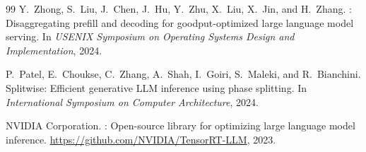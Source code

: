 \documentclass[10pt,twocolumn]{article}
\begin{document}
\begin{thebibliography}{99}
Y.~Zhong, S.~Liu, J.~Chen, J.~Hu, Y.~Zhu, X.~Liu, X.~Jin, and H.~Zhang.
: Disaggregating prefill and decoding for goodput-optimized
large language model serving.
\newblock In \textit{USENIX Symposium on Operating Systems Design and
Implementation}, 2024.

P.~Patel, E.~Choukse, C.~Zhang, A.~Shah, I.~Goiri, S.~Maleki, and
R.~Bianchini.
\newblock Splitwise: Efficient generative {LLM} inference using phase splitting.
\newblock In \textit{International Symposium on Computer Architecture}, 2024.

{NVIDIA Corporation}.
: Open-source library for optimizing large language
model inference.
\newblock \url{https://github.com/NVIDIA/TensorRT-LLM}, 2023.

\end{thebibliography}
\end{document}
